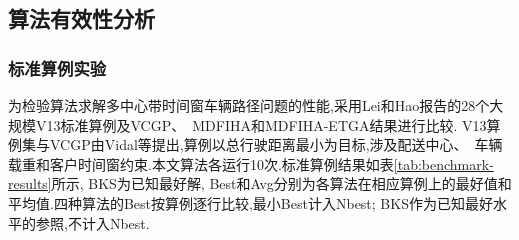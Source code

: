 \documentclass{setp-new}
\begin{document}
\subsection{算法有效性分析}

\subsubsection{标准算例实验}

为检验算法求解多中心带时间窗车辆路径问题的性能,采用Lei和Hao\cite{ref:75}报告的28个大规模V13标准算例及VCGP、~MDFIHA和MDFIHA-ETGA结果进行比较. V13算例集与VCGP由Vidal等\cite{ref:74}提出,算例以总行驶距离最小为目标,涉及配送中心、~车辆载重和客户时间窗约束.本文算法各运行10次.标准算例结果如表\ref{tab:benchmark-results}所示, BKS为已知最好解, Best和Avg分别为各算法在相应算例上的最好值和平均值.四种算法的Best按算例逐行比较,最小Best计入Nbest; BKS作为已知最好水平的参照,不计入Nbest.
\end{document}
